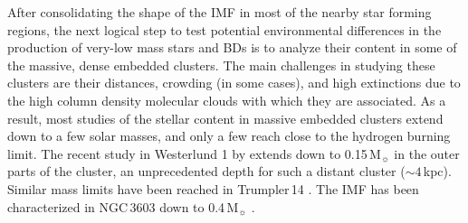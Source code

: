 \documentclass[a4paper,fleqn,usenatbib]{mnras}
\begin{document}
After consolidating the shape of the IMF in most of the nearby star forming regions,
the next logical step to test potential
environmental differences in the production of very-low mass stars and BDs is to analyze their content in some of the massive, dense
embedded clusters.  
The main challenges in studying these clusters are their distances, crowding (in some cases), and high extinctions due to the high column density molecular clouds
with which they are associated. As a result, most studies of the stellar content in massive embedded clusters extend down to
a few solar masses, and only a few reach close to the hydrogen burning limit. The recent study in Westerlund 1 by \citet{andersen16} extends down 
to 0.15\,M$_{\sun}$ in the outer parts of the cluster, an unprecedented depth for such a distant cluster ($\sim 4\,$kpc). 
Similar mass limits have been reached in Trumpler\,14 \citep{rochau11}.
The IMF has been characterized in NGC\,3603 down to 0.4\,M$_{\sun}$ \citep{stolte06, harayama08}.
\end{document}
